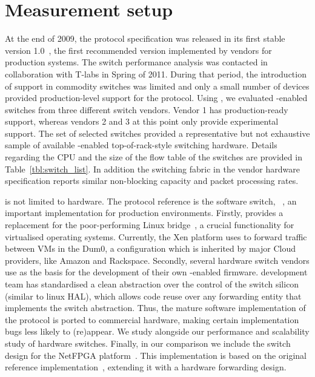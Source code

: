 \section{Measurement setup}\label{sec:oflops-switches}


At the end of 2009, the \of protocol specification was released in its first
stable version 1.0~\cite{openflow-spec}, the first recommended version
implemented by vendors for production systems.  The switch performance analysis
was contacted in collaboration with T-labs in Spring of 2011. During that
period, the introduction of \of support in commodity switches was limited and
only a small number of devices provided production-level support for the
protocol.  Using \oflops, we evaluated \of-enabled switches from three different
switch vendors.  Vendor 1 has production-ready \of support, whereas vendors 2
and 3 at this point only provide experimental \of support.  The set of selected
switches provided a representative but not exhaustive sample of available
\of-enabled top-of-rack-style switching hardware. Details regarding the CPU and
the size of the flow table of the switches are provided in
Table~\ref{tbl:switch_list}. In addition the switching fabric in the vendor
hardware specification reports similar non-blocking capacity and packet
processing rates. 

\of is not limited to hardware. The \of protocol reference is the software
switch, \ovs~\cite{openvswitch}, an important implementation for
production environments. Firstly, \ovs provides a replacement for the
poor-performing Linux bridge~\cite{bianco10}, a crucial functionality for
virtualised operating systems.  Currently, the Xen platform uses \ovs to
forward traffic between VMs in the Dum0, a configuration which is inherited by
major Cloud providers, like Amazon and Rackspace.  Secondly, several hardware
switch vendors use \ovs as the basis for the development of their own
\of-enabled firmware.  \ovs development team has standardised a clean
abstraction over the control of the switch silicon (similar to linux HAL), which
allows code reuse over any forwarding entity that implements the switch
abstraction. Thus, the mature software implementation of the \of protocol is
ported to commercial hardware, making certain implementation bugs less likely to
(re)appear.  We study \ovs alongside our performance and scalability
study of hardware switches. Finally, in our comparison we include the \of switch
design for the NetFPGA platform~\cite{openflow-netfpga}. This implementation is
based on the original \of reference implementation~\cite{of-reference-impl}, 
extending it with a hardware forwarding design. 

